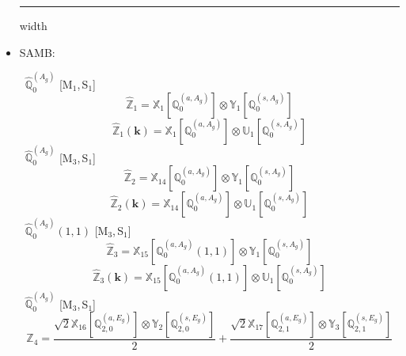 \documentclass[fleqn,10pt,landscape]{article}
\begin{document}
\begin{itemize}
 \hfil \hrule height 1mm width \textwidth \hfil

\item SAMB:

\vspace{4mm}
\noindent {} $\,\,\,\hat{\mathbb{Q}}_{0}^{(A_{g})}$ [M$_{1}$,\,S$_{1}$]
\begin{dmath*}
\hat{\mathbb{Z}}_{1}=\mathbb{X}_{1}[\mathbb{Q}_{0}^{(a,A_{g})}] \otimes\mathbb{Y}_{1}[\mathbb{Q}_{0}^{(s,A_{g})}]
\end{dmath*}
\begin{dmath*}
\hat{\mathbb{Z}}_{1}(\bm{k})=\mathbb{X}_{1}[\mathbb{Q}_{0}^{(a,A_{g})}] \otimes\mathbb{U}_{1}[\mathbb{Q}_{0}^{(s,A_{g})}]
\end{dmath*}
\vspace{4mm}
\noindent {} $\,\,\,\hat{\mathbb{Q}}_{0}^{(A_{g})}$ [M$_{3}$,\,S$_{1}$]
\begin{dmath*}
\hat{\mathbb{Z}}_{2}=\mathbb{X}_{14}[\mathbb{Q}_{0}^{(a,A_{g})}] \otimes\mathbb{Y}_{1}[\mathbb{Q}_{0}^{(s,A_{g})}]
\end{dmath*}
\begin{dmath*}
\hat{\mathbb{Z}}_{2}(\bm{k})=\mathbb{X}_{14}[\mathbb{Q}_{0}^{(a,A_{g})}] \otimes\mathbb{U}_{1}[\mathbb{Q}_{0}^{(s,A_{g})}]
\end{dmath*}
\vspace{4mm}
\noindent {} $\,\,\,\hat{\mathbb{Q}}_{0}^{(A_{g})}(1,1)$ [M$_{3}$,\,S$_{1}$]
\begin{dmath*}
\hat{\mathbb{Z}}_{3}=\mathbb{X}_{15}[\mathbb{Q}_{0}^{(a,A_{g})}(1,1)] \otimes\mathbb{Y}_{1}[\mathbb{Q}_{0}^{(s,A_{g})}]
\end{dmath*}
\begin{dmath*}
\hat{\mathbb{Z}}_{3}(\bm{k})=\mathbb{X}_{15}[\mathbb{Q}_{0}^{(a,A_{g})}(1,1)] \otimes\mathbb{U}_{1}[\mathbb{Q}_{0}^{(s,A_{g})}]
\end{dmath*}
\vspace{4mm}
\noindent {} $\,\,\,\hat{\mathbb{Q}}_{0}^{(A_{g})}$ [M$_{3}$,\,S$_{1}$]
\begin{dmath*}
\hat{\mathbb{Z}}_{4}=\frac{\sqrt{2} \mathbb{X}_{16}[\mathbb{Q}_{2,0}^{(a,E_{g})}] \otimes\mathbb{Y}_{2}[\mathbb{Q}_{2,0}^{(s,E_{g})}]}{2} + \frac{\sqrt{2} \mathbb{X}_{17}[\mathbb{Q}_{2,1}^{(a,E_{g})}] \otimes\mathbb{Y}_{3}[\mathbb{Q}_{2,1}^{(s,E_{g})}]}{2}

\end{dmath*}
\end{itemize}
\end{document}
